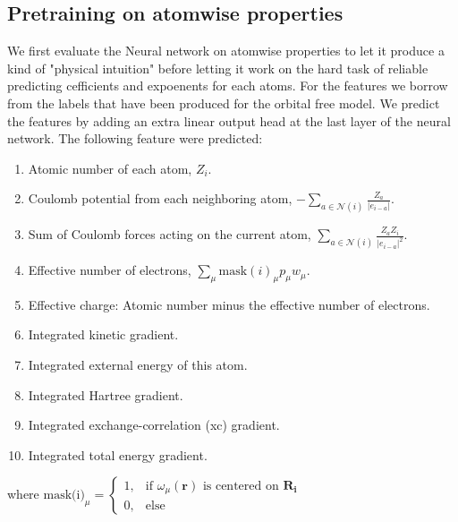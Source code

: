 \subsection{Pretraining on atomwise properties}
We first evaluate the Neural network on atomwise properties to let it produce a kind of "physical intuition" before letting it work on the hard task of reliable predicting cefficients and expoenents for each atoms. For the features we borrow from the labels that have been produced for the orbital free model.
We predict the features by adding an extra linear output head at the last layer of the neural network. 
The following feature were predicted:
\begin{enumerate}
    \item Atomic number of each atom, $Z_i$.
    \item Coulomb potential from each neighboring atom, $-\sum\limits_{a \in \mathcal{N}(i)} \frac{Z_a}{|e_{i-a}|}$.
    \item Sum of Coulomb forces acting on the current atom, $\sum\limits_{a \in \mathcal{N}(i)} \frac{Z_a Z_i}{|e_{i-a}|^2}$.
    \item Effective number of electrons, $\sum\limits_{\mu} \text{mask}(i)_\mu p_\mu w_\mu$.
    \item Effective charge: Atomic number minus the effective number of electrons.
    \item Integrated kinetic gradient.
    \item Integrated external energy of this atom.
    \item Integrated Hartree gradient.
    \item Integrated exchange-correlation (xc) gradient.
    \item Integrated total energy gradient.
\end{enumerate}
where $\text{mask(i)}_\mu =
\begin{cases}
1, & \text{if } \omega_\mu(\mathbf{r}) \text{ is centered on } \mathbf{R_i} \\
0, & \text{else}
\end{cases}$

